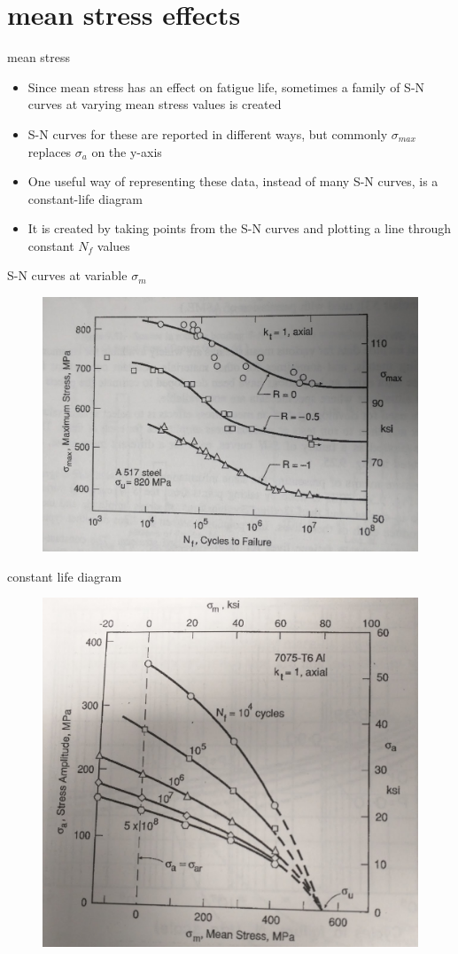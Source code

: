 \documentclass[10pt]{beamer}
\begin{document}
\section{mean stress effects}

\begin{frame}{mean stress}
	\begin{itemize}[<+->]
		\item Since mean stress has an effect on fatigue life, sometimes a family of S-N curves at varying mean stress values is created
		\item S-N curves for these are reported in different ways, but commonly $\sigma_{max}$ replaces $\sigma_a$ on the y-axis
		\item One useful way of representing these data, instead of many S-N curves, is a constant-life diagram
		\item It is created by taking points from the S-N curves and plotting a line through constant $N_f$ values
	\end{itemize}
\end{frame}

\begin{frame}{S-N curves at variable $\sigma_m$}
\begin{figure}
\centering
\includegraphics[width=0.7\linewidth]{../Figures/meanstress}
\label{fig:meanstress}
\end{figure}
\end{frame}

\begin{frame}{constant life diagram}
\begin{figure}
\centering
\includegraphics[width=0.7\linewidth]{../Figures/constant-life}
\label{fig:constant-life}
\end{figure}
\end{frame}
\end{document}
